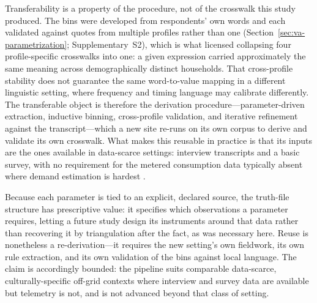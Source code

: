 \documentclass[final,3p,times,onecolumn]{elsarticle}
\begin{document}
Transferability is a property of the procedure, not of the crosswalk this study produced. The bins were developed from respondents' own words and each validated against quotes from multiple profiles rather than one (Section~\ref{sec:va-parametrization}; Supplementary~S2), which is what licensed collapsing four profile-specific crosswalks into one: a given expression carried approximately the same meaning across demographically distinct households. That cross-profile stability does not guarantee the same word-to-value mapping in a different linguistic setting, where frequency and timing language may calibrate
differently. The transferable object is therefore the derivation procedure---parameter-driven extraction, inductive binning, cross-profile validation, and iterative refinement against the transcript---which a new site re-runs on its own corpus to derive and validate its own crosswalk. What makes this reusable in practice is that its inputs are the ones available in data-scarce settings: interview transcripts and a basic survey, with no requirement for the metered consumption data typically absent where demand estimation is hardest \citep{data-scarcity}.

Because each parameter is tied to an explicit, declared source, the truth-file structure has prescriptive value: it specifies which observations a parameter requires, letting a future study design its instruments around that data rather than recovering it by triangulation after the fact, as was necessary here. Reuse
is nonetheless a re-derivation---it requires the new setting's own fieldwork, its own rule extraction, and its own validation of the bins against local language. The claim is accordingly bounded: the pipeline suits comparable data-scarce, culturally-specific off-grid contexts where interview and survey data are
available but telemetry is not, and is not advanced beyond that class of setting.
\end{document}
